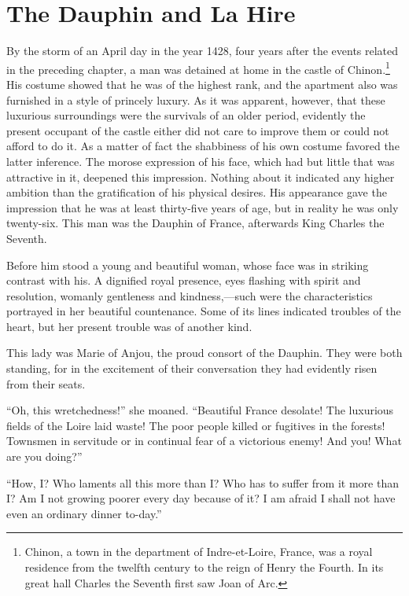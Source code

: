 \chapter{The Dauphin and La Hire}

\drop By the storm of an April day in the year 1428, four years after
the events related in the preceding chapter, a man was detained at home
in the castle of Chinon.\footnote{Chinon, a town in the department of
  Indre-et-Loire, France, was a royal residence from the twelfth century
  to the reign of Henry the Fourth. In its great hall Charles the
  Seventh first saw Joan of Arc.} His costume showed that he was of the
highest rank, and the apartment also was furnished in a style of
princely luxury. As it was apparent, however, that these luxurious
surroundings were the survivals of an older period, evidently the
present occupant of the castle either did not care to improve them or
could not afford to do it. As a matter of fact the shabbiness of his own
costume favored the latter inference. The morose expression of his face,
which had but little that was attractive in it, deepened this
impression. Nothing about it indicated any higher ambition than the
gratification of his physical desires. His appearance gave the
impression that he was at least thirty-five years of age, but in reality
he was only twenty-six. This man was the Dauphin of France, afterwards
King Charles the Seventh.

Before him stood a young and beautiful woman, whose face was in striking
contrast with his. A dignified royal presence, eyes flashing with spirit
and resolution, womanly gentleness and kindness,---such were the
characteristics portrayed in her beautiful countenance. Some of its
lines indicated troubles of the heart, but her present trouble was of
another kind.

This lady was Marie of Anjou, the proud consort of the Dauphin. They
were both standing, for in the excitement of their conversation they had
evidently risen from their seats.

``Oh, this wretchedness!'' she moaned. ``Beautiful France desolate! The
luxurious fields of the Loire laid waste! The poor people killed or
fugitives in the forests! Townsmen in servitude or in continual fear of
a victorious enemy! And you! What are you doing?''

``How, I? Who laments all this more than I? Who has to suffer from it
more than I? Am I not growing poorer every day because of it? I am
afraid I shall not have even an ordinary dinner to-day.''

